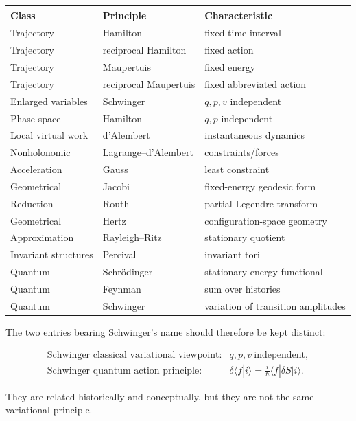 \begin{center}
\begin{tabular}{lll}
\hline
\textbf{Class} & \textbf{Principle} & \textbf{Characteristic} \\
\hline
Trajectory & Hamilton & fixed time interval \\
Trajectory & reciprocal Hamilton & fixed action \\
Trajectory & Maupertuis & fixed energy \\
Trajectory & reciprocal Maupertuis & fixed abbreviated action \\
Enlarged variables & Schwinger & \(q,p,v\) independent \\
Phase-space & Hamilton & \(q,p\) independent \\
Local virtual work & d'Alembert & instantaneous dynamics \\
Nonholonomic & Lagrange--d'Alembert & constraints/forces \\
Acceleration & Gauss & least constraint \\
Geometrical & Jacobi & fixed-energy geodesic form \\
Reduction & Routh & partial Legendre transform \\
Geometrical & Hertz & configuration-space geometry \\
Approximation & Rayleigh--Ritz & stationary quotient \\
Invariant structures & Percival & invariant tori \\
Quantum & Schrödinger & stationary energy functional \\
Quantum & Feynman & sum over histories \\
Quantum & Schwinger & variation of transition amplitudes \\
\hline
\end{tabular}
\end{center}

The two entries bearing Schwinger's name should therefore be kept distinct:

\begin{equation}
\boxed{
\begin{array}{ll}
\text{Schwinger classical variational viewpoint:}
&
q,p,v\ \text{independent},\\
[5pt]
\text{Schwinger quantum action principle:}
&
\delta\langle f|i\rangle=
\frac{i}{\hbar}
\langle f|\delta S|i\rangle.
\end{array}}
\end{equation}

They are related historically and conceptually, but they are not the same variational principle.

